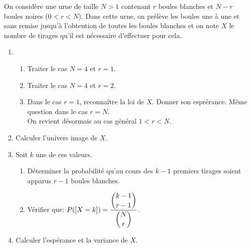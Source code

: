 \documentclass[a4paper, 11pt,reqno]{article}
\begin{document}
\begin{correction}
	On consid\`ere une urne de taille $N>1$ contenant $r$ boules blanches et $N-r$ boules noires ($0<r<N$). Dans cette urne, on pr\'el\`eve les boules une \`a une et sans remise jusqu'\`a l'obtention de toutes les boules blanches et on note $X$ le nombre de tirages qu'il est n\'ecessaire d'effectuer pour cela.
	\begin{enumerate}
		\item
		      \begin{enumerate}
			      \item Traiter le cas $N=4$ et $r=1$.
			      \item Traiter le cas $N=4$ et $r=2$.
			      \item Dans le cas $r=1$, reconna\^itre la loi de $X$. Donner son espr\'erance. M\^eme question dans le cas $r=N$.\\
			            \noindent On revient d\'esormais au cas g\'en\'eral $1<r<N$.
		      \end{enumerate}
		\item Calculer l'univers image de $X$.
		\item Soit $k$ une de ces valeurs.
		      \begin{enumerate}
			      \item D\'eterminer la probabilit\'e qu'au cours des $k-1$ premiers tirages soient apparus $r-1$ boules blanches.
			      \item V\'erifier que: $P(\lbrack X=k\rbrack)=\displaystyle\frac{\displaystyle \binom{k-1}{r-1}}{\displaystyle \binom{N}{r}}$.
		      \end{enumerate}
		\item Calculer l'esp\'erance et la variance de $X$.
	\end{enumerate}
\end{correction}
\end{document}
